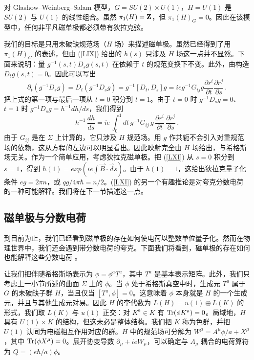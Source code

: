 对 Glashow–Weinberg–Salam 模型，$G=SU(2)\times U(1)$，$H=U(1)$ 是 $SU(2)$ 与 $U(1)$ 的线性组合。虽然 $\pi_{1} (H) = {\bf Z}$，但 $\pi_{1} (H)_{G} = 0$。因此在该模型中，任何非平凡磁单极都必须带有狄拉克弦。

我们的目标是只用未破缺规范场（$H$ 场）来描述磁单极。虽然已经得到了用 $\pi_1(H)_G$ 的表述，但由 (\ref{LIX}) 给出的 $h(s)$ 只涉及 $H$ 场这一点并不显然。下面来说明：量 $g^{-1}(s,t)D_s g(s,t)$ 在依赖于 $t$ 的规范变换下不变。此外，由构造 $D_t g(s,t)=0$。因此可以写出
\begin{equation}
\partial_t(g^{-1}D_s g)= D_t(g^{-1}D_s g)=g^{-1}[D_t,D_s] g =
ie g^{-1} G_{ij} g \frac{\partial r^i}{\partial t} \frac{\partial r^j}
{\partial s}\,.
\label{LX}
\end{equation}
把上式的第一项与最后一项从 $t=0$ 积分到 $t=1$。由于 $t=0$ 时 $g^{-1}D_s g=0$、$t=1$ 时 $g^{-1}D_s g=h^{-1}dh/ds$，我们得到
\begin{equation}
h^{-1} \, \frac{dh}{ds} = ie \, \int^{1}_{0} dt \,
g^{-1} G_{ij}\,g \,\frac{\partial r^i}{\partial t} \,
\frac{\partial r^j}{\partial s}\,.
\label{LXI}
\end{equation}
由于 $G_{ij}$ 是在 $\Sigma$ 上计算的，它只涉及 $H$ 规范场。用 $g$ 作共轭不会引入对重规范场的依赖，这从方程的左边可以明显看出。因此映射完全由 $H$ 场给出，与希格斯场无关。作为一个简单应用，考虑狄拉克磁单极。把 (\ref{LXI}) 从 $s=0$ 积分到 $s=1$，得到 $h(1)=exp(ie\int {\vec B}\cdot{\vec ds})$。由于 $h(1)=1$，这给出狄拉克量子化条件 $eg=2\pi n$，或 $qg/4\pi\hbar=n/2$。(\ref{LXI}) 的另一个有趣推论是对夸克分数电荷的一种可能解释。我们将在下一节描述这一点。

\subsection{磁单极与分数电荷}

到目前为止，我们已经看到磁单极的存在如何使电荷以整数单位量子化。然而在物理世界中，我们还会遇到带分数电荷的夸克。下面我们将看到，磁单极的存在如何也能解释这些分数电荷 \cite{CO,GO}。

让我们把伴随希格斯场表示为 $\phi=\phi^a T^a$，其中 $T^a$ 是基本表示矩阵。此外，我们只考虑上一小节所述的曲面 $\Sigma$ 上的 $\phi$。当 $\phi$ 处于希格斯真空中时，生成元 $T^a$ 属于 $G$ 的未破缺子群 $H$，当且仅当 $[T^a,\phi]=0$。这意味着 $\phi$ 本身就是 $H$ 的一个生成元，并且与其他生成元对易。因此 $H$ 的李代数为 $L(H)=u(1)\oplus L(K)$ 的形式，我们取 $L(K)$ 与 $u(1)$ 正交：对 $K^a\in K$ 有 ${\rm Tr}(\phi K^a)=0$。局域地，$H$ 具有 $U(1)\times K$ 的结构，但这未必是整体结构。我们把 $K$ 称为色群，并把 $U(1)$ 认同为电磁相互作用对应的群。$H$ 中的规范场可分解为 $W^\mu=A^\mu\phi/a + X^\mu$，其中 ${\rm Tr}(\phi X^\mu)=0$。展开协变导数 $\partial_\mu+ ie W_\mu$，可以确定与 $A_\mu$ 耦合的电荷算符为 $Q=(e\hbar/a)\phi$。

